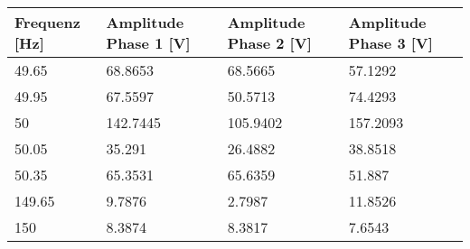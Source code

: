 \newpage
\begin{table}[ht!]
	\centering
	\begin{tabular}{|l|l|l|l|}
		\hline
		Frequenz {[}Hz{]} & Amplitude Phase 1 {[}V{]}                                                           & Amplitude Phase 2 {[}V{]}                                                           & Amplitude Phase 3 {[}V{]}                                                           \\ \hline
		49.65             & 68.8653                                                                             & 68.5665                                                                             & 57.1292                                                                             \\ \hline
		49.95             & 67.5597                                                                             & 50.5713                                                                             & 74.4293                                                                             \\ \hline
		50                & 142.7445                                                                            & 105.9402                                                                            & 157.2093                                                                            \\ \hline
		50.05             & 35.291                                                                              & 26.4882                                                                             & 38.8518                                                                             \\ \hline
		50.35             & 65.3531                                                                             & 65.6359                                                                             & 51.887                                                                              \\ \hline
		149.65            & 9.7876                                                                              & 2.7987                                                                              & 11.8526                                                                             \\ \hline
		150               & 8.3874                                                                              & 8.3817                                                                              & 7.6543                                                                              \\ \hline

\end{tabular}
\end{table}
